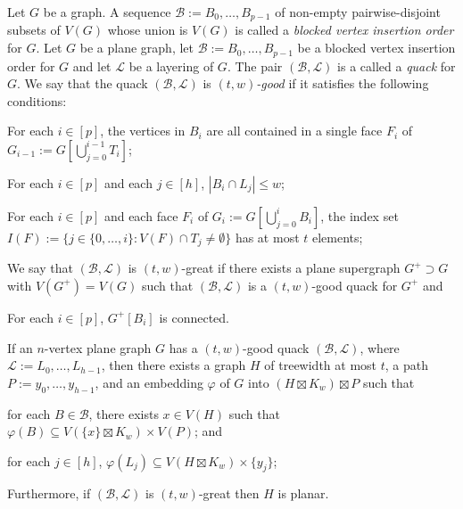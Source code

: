 \documentclass{patmorin}
\newcommand{\defin}[1]{\emph{\textcolor{brightmaroon}{#1}}}
\begin{document}
Let $G$ be a graph.  A sequence $\mathcal{B}:=B_0,\ldots,B_{p-1}$ of non-empty pairwise-disjoint subsets of $V(G)$ whose union is $V(G)$ is called a \defin{blocked vertex insertion order} for $G$. Let $G$ be a plane graph, let $\mathcal{B}:=B_0,\ldots,B_{p-1}$ be a blocked vertex insertion order for $G$ and let $\mathcal{L}$ be a layering of $G$.   The pair $(\mathcal{B},\mathcal{L})$ is a called a \defin{quack} for $G$.  We say that  the quack $(\mathcal{B},\mathcal{L})$ is \defin{$(t,w)$-good} if it satisfies the following conditions:
\begin{compactenum}[({good}-a)]
  \item For each $i\in[p]$, the vertices in $B_i$ are all contained in a single face $F_i$ of $G_{i-1}:=G[\bigcup_{j=0}^{i-1} T_i]$;
  \item For each $i\in[p]$ and each $j\in[h]$, $|B_i\cap L_j|\le w$;
  \item For each $i\in[p]$ and each face $F_i$ of $G_i:=G[\bigcup_{j=0}^i B_i]$, the index set $I(F):=\{j\in\{0,\ldots,i\}:V(F)\cap T_j\neq\emptyset\}$ has at most $t$ elements;
\end{compactenum}

We say that $(\mathcal{B},\mathcal{L})$ is $(t,w)$-great if there exists a plane supergraph $G^+\supset G$ with $V(G^+)=V(G)$ such that $(\mathcal{B},\mathcal{L})$ is a $(t,w)$-good quack for $G^+$ and

\begin{compactenum}[({good}-a)]\setcounter{enumi}{23}
  \item For each $i\in[p]$, $G^+[B_i]$ is connected.
\end{compactenum}

\begin{lem}\label{tw_good_quack}
  If an $n$-vertex plane graph $G$ has a $(t,w)$-good quack $(\mathcal{B},\mathcal{L})$, where $\mathcal{L}:=L_0,\ldots,L_{h-1}$, then there exists a graph $H$ of treewidth at most $t$, a path $P:=y_0,\ldots,y_{h-1}$, and an embedding $\varphi$ of $G$ into $(H\boxtimes K_w)\boxtimes P$ such that
  \begin{compactenum}[(i)]
    \item for each $B\in\mathcal{B}$, there exists $x\in V(H)$ such that $\varphi(B)\subseteq V(\{x\}\boxtimes K_w)\times V(P)$; and
    \item for each $j\in[h]$, $\varphi(L_j)\subseteq V(H\boxtimes K_w)\times\{y_j\}$;
  \end{compactenum}
  Furthermore, if $(\mathcal{B},\mathcal{L})$ is $(t,w)$-great then $H$ is planar.
\end{lem}
\end{document}
